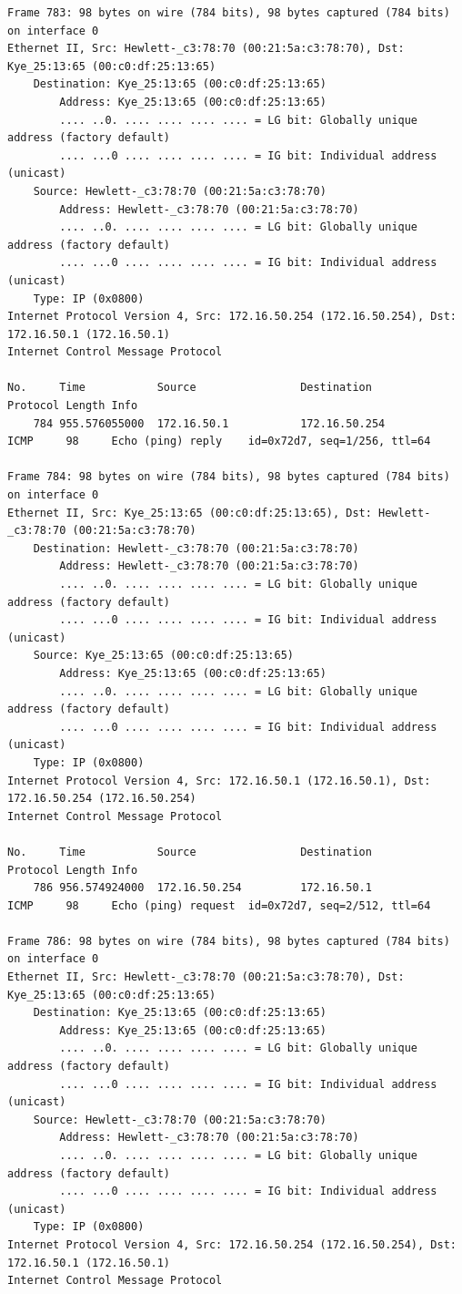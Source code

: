 \documentclass[a4paper,11pt]{article}
\begin{document}
\begin{lstlisting}
Frame 783: 98 bytes on wire (784 bits), 98 bytes captured (784 bits) on interface 0
Ethernet II, Src: Hewlett-_c3:78:70 (00:21:5a:c3:78:70), Dst: Kye_25:13:65 (00:c0:df:25:13:65)
    Destination: Kye_25:13:65 (00:c0:df:25:13:65)
        Address: Kye_25:13:65 (00:c0:df:25:13:65)
        .... ..0. .... .... .... .... = LG bit: Globally unique address (factory default)
        .... ...0 .... .... .... .... = IG bit: Individual address (unicast)
    Source: Hewlett-_c3:78:70 (00:21:5a:c3:78:70)
        Address: Hewlett-_c3:78:70 (00:21:5a:c3:78:70)
        .... ..0. .... .... .... .... = LG bit: Globally unique address (factory default)
        .... ...0 .... .... .... .... = IG bit: Individual address (unicast)
    Type: IP (0x0800)
Internet Protocol Version 4, Src: 172.16.50.254 (172.16.50.254), Dst: 172.16.50.1 (172.16.50.1)
Internet Control Message Protocol

No.     Time           Source                Destination           Protocol Length Info
    784 955.576055000  172.16.50.1           172.16.50.254         ICMP     98     Echo (ping) reply    id=0x72d7, seq=1/256, ttl=64

Frame 784: 98 bytes on wire (784 bits), 98 bytes captured (784 bits) on interface 0
Ethernet II, Src: Kye_25:13:65 (00:c0:df:25:13:65), Dst: Hewlett-_c3:78:70 (00:21:5a:c3:78:70)
    Destination: Hewlett-_c3:78:70 (00:21:5a:c3:78:70)
        Address: Hewlett-_c3:78:70 (00:21:5a:c3:78:70)
        .... ..0. .... .... .... .... = LG bit: Globally unique address (factory default)
        .... ...0 .... .... .... .... = IG bit: Individual address (unicast)
    Source: Kye_25:13:65 (00:c0:df:25:13:65)
        Address: Kye_25:13:65 (00:c0:df:25:13:65)
        .... ..0. .... .... .... .... = LG bit: Globally unique address (factory default)
        .... ...0 .... .... .... .... = IG bit: Individual address (unicast)
    Type: IP (0x0800)
Internet Protocol Version 4, Src: 172.16.50.1 (172.16.50.1), Dst: 172.16.50.254 (172.16.50.254)
Internet Control Message Protocol

No.     Time           Source                Destination           Protocol Length Info
    786 956.574924000  172.16.50.254         172.16.50.1           ICMP     98     Echo (ping) request  id=0x72d7, seq=2/512, ttl=64

Frame 786: 98 bytes on wire (784 bits), 98 bytes captured (784 bits) on interface 0
Ethernet II, Src: Hewlett-_c3:78:70 (00:21:5a:c3:78:70), Dst: Kye_25:13:65 (00:c0:df:25:13:65)
    Destination: Kye_25:13:65 (00:c0:df:25:13:65)
        Address: Kye_25:13:65 (00:c0:df:25:13:65)
        .... ..0. .... .... .... .... = LG bit: Globally unique address (factory default)
        .... ...0 .... .... .... .... = IG bit: Individual address (unicast)
    Source: Hewlett-_c3:78:70 (00:21:5a:c3:78:70)
        Address: Hewlett-_c3:78:70 (00:21:5a:c3:78:70)
        .... ..0. .... .... .... .... = LG bit: Globally unique address (factory default)
        .... ...0 .... .... .... .... = IG bit: Individual address (unicast)
    Type: IP (0x0800)
Internet Protocol Version 4, Src: 172.16.50.254 (172.16.50.254), Dst: 172.16.50.1 (172.16.50.1)
Internet Control Message Protocol


\end{lstlisting}
\end{document}
